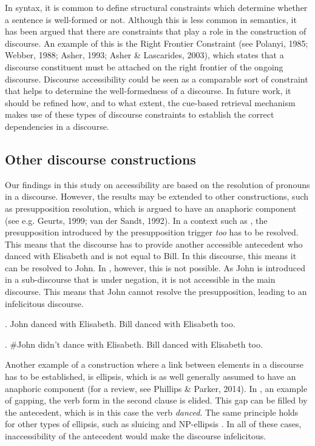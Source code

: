 \documentclass[11pt]{article} %
\begin{document}
In syntax, it is common to define structural constraints which determine whether a sentence is well-formed or not. Although this is less common in semantics, it has been argued that there are constraints that play a role in the construction of discourse. An example of this is the Right Frontier Constraint (see Polanyi, 1985; Webber, 1988; Asher, 1993; Asher \& Lascarides, 2003), which states that a discourse constituent must be attached on the right frontier of the ongoing discourse. Discourse accessibility could be seen as a comparable sort of constraint that helps to determine the well-formedness of a discourse. In future work, it should be refined how, and to what extent, the cue-based retrieval mechanism makes use of these types of discourse constraints to establish the correct dependencies in a discourse.

\subsection{Other discourse constructions}
Our findings in this study on accessibility are based on the resolution of pronouns in a discourse. However, the results may be extended to other constructions, such as presupposition resolution, which is argued to have an anaphoric component (see e.g. Geurts, 1999; van der Sandt, 1992). In a context such as \Next, the presupposition introduced by the presupposition trigger \textit{too} has to be resolved. This means that the discourse has to provide another accessible antecedent who danced with Elisabeth and is not equal to Bill. In this discourse, this means it can be resolved to John. In \NNext, however, this is not possible. As John is introduced in a sub-discourse that is under negation, it is not accessible in the main discourse. This means that John cannot resolve the presupposition, leading to an infelicitous discourse. 

\ex. John danced with Elisabeth. Bill danced with Elisabeth too.

\ex. \#John didn't dance with Elisabeth. Bill danced with Elisabeth too.


Another example of a construction where a link between elements in a discourse has to be established, is ellipsis, which is as well generally assumed to have an anaphoric component (for a review, see Phillips \& Parker, 2014). In \Next[a], an example of gapping, the verb form in the second clause is elided. This gap can be filled by the antecedent, which is in this case the verb \textit{danced}. The same principle holds for other types of ellipsis, such as sluicing \Next[b] and NP-ellipsis \Next[c]. In all of these cases, inaccessibility of the antecedent would make the discourse infelicitous.
\end{document}
